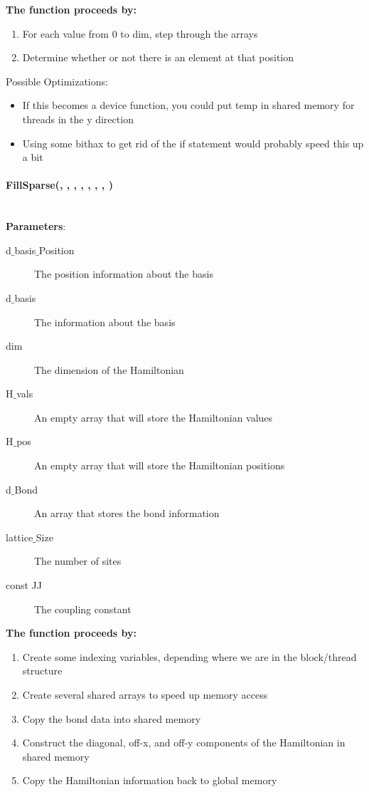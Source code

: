 \documentclass{article}
\begin{document}
\noindent\textbf{The function proceeds by:}
\begin{enumerate}
\item{For each value from 0 to dim, step through the arrays}
\item{Determine whether or not there is an element at that position}
\end{enumerate}

Possible Optimizations:
\begin{itemize}
\item{If this becomes a device function, you could put temp in shared memory for threads in the y direction}
\item{Using some bithax to get rid of the if statement would probably speed this up a bit}
\end{itemize}

\paragraph{\cudaglobal \void FillSparse(\typelongptr , \typelongptr , \int, \cuDoubleComplex , \typelongtwoptr , \int , \int , \const \double ) \\ \\ }
\noindent\textbf{Parameters}:
\begin{description}
\item[\typelongptr d$\_$basis$\_$Position] The position information about the basis
\item[\typelongptr d$\_$basis] The information about the basis
\item[\long dim] The dimension of the Hamiltonian
\item[\cuDoubleComplex H$\_$vals] An empty array that will store the Hamiltonian values
\item[\typelongtwoptr H$\_$pos] An empty array that will store the Hamiltonian positions
\item[\int d$\_$Bond] An array that stores the bond information
\item[\int lattice$\_$Size] The number of sites
\item[const \double JJ] The coupling constant
\end{description}

\noindent\textbf{The function proceeds by:}
\begin{enumerate}
\item{Create some indexing variables, depending where we are in the block/thread structure}
\item{Create several shared arrays to speed up memory access}
\item{Copy the bond data into shared memory}
\item{Construct the diagonal, off-x, and off-y components of the Hamiltonian in shared memory}
\item{Copy the Hamiltonian information back to global memory}
\end{enumerate}
\end{document}
